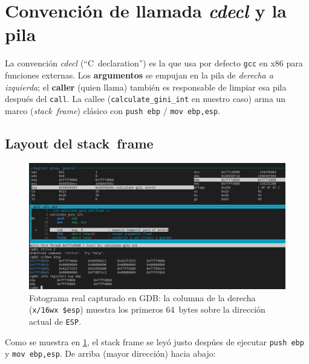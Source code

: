 \documentclass[a4paper,12pt]{article}
\begin{document}
\section{Convención de llamada \emph{cdecl} y la pila}
La convención \emph{cdecl} (``C declaration'') es la que usa por defecto
\texttt{gcc} en x86 para funciones externas.  
Los \textbf{argumentos} se empujan en la pila de \emph{derecha a izquierda};
el \textbf{caller} (quien llama) también es responsable de limpiar esa pila
después del \texttt{call}.  
La callee (\texttt{calculate\_gini\_int} en nuestro caso) arma un marco
(\emph{stack frame}) clásico con \texttt{push ebp} / \texttt{mov ebp,esp}.

\subsection{Layout del stack frame}
\begin{figure}[H]
  \centering
  \includegraphics[width=.9\textwidth]{images/stack_frame.jpeg}
  \caption{Fotograma real capturado en GDB: la columna de la derecha
           (\texttt{x/16wx \$esp}) muestra los primeros 64~bytes sobre la
           dirección actual de \texttt{ESP}.}\label{fig:layout_frame}
\end{figure}

Como se muestra en \cref{fig:layout_frame}, el stack frame se leyó justo despúes de ejecutar
\lstinline{push ebp} y \lstinline{mov ebp,esp}.  
De arriba (mayor dirección) hacia abajo:
\end{document}
